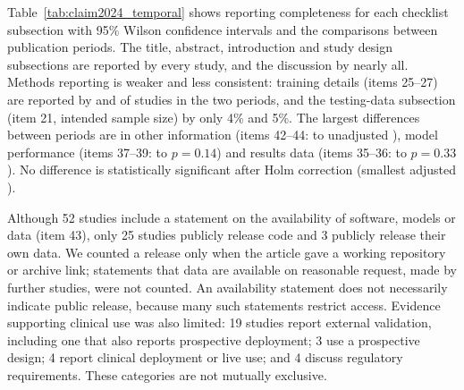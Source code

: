 

Table~\ref{tab:claim2024_temporal} shows reporting completeness for each checklist subsection with 95\% Wilson confidence intervals and the comparisons between publication periods. The title, abstract, introduction and study design subsections are reported by every study, and the discussion by nearly all. Methods reporting is weaker and less consistent: training details (items 25--27) are reported by  and  of studies in the two periods, and the testing-data subsection (item 21, intended sample size) by only 4\% and 5\%. The largest differences between periods are in other information (items 42--44:  to  unadjusted ), model performance (items 37--39:  to  $p=0.14$) and results data (items 35--36:  to  $p=0.33$). No difference is statistically significant after Holm correction (smallest adjusted ).





Although 52 studies  include a statement on the availability of software, models or data (item 43), only 25 studies  publicly release code and 3  publicly release their own data. We counted a release only when the article gave a working repository or archive link; statements that data are available on reasonable request, made by  further studies, were not counted. An availability statement does not necessarily indicate public release, because many such statements restrict access. Evidence supporting clinical use was also limited: 19 studies  report external validation, including one that also reports prospective deployment; 3  use a prospective design; 4  report clinical deployment or live use; and 4  discuss regulatory requirements. These categories are not mutually exclusive.

